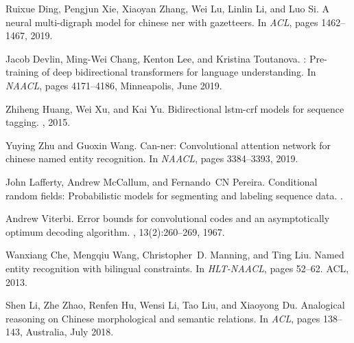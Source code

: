 \documentclass[conference]{IEEEtran}
\begin{document}
\begin{thebibliography}{00}
    Ruixue Ding, Pengjun Xie, Xiaoyan Zhang, Wei Lu, Linlin Li, and Luo Si.
    \newblock A neural multi-digraph model for chinese ner with gazetteers.
    \newblock In {\em ACL}, pages 1462--1467, 2019.
    
    Jacob Devlin, Ming-Wei Chang, Kenton Lee, and Kristina Toutanova.
    : Pre-training of deep bidirectional transformers for language
      understanding.
    \newblock In {\em NAACL}, pages 4171--4186, Minneapolis, June 2019.
    
    Zhiheng Huang, Wei Xu, and Kai Yu.
    \newblock Bidirectional lstm-crf models for sequence tagging.
    , 2015.
    
    Yuying Zhu and Guoxin Wang.
    \newblock Can-ner: Convolutional attention network for chinese named entity
      recognition.
    \newblock In {\em NAACL}, pages 3384--3393, 2019.
    
    John Lafferty, Andrew McCallum, and Fernando~CN Pereira.
    \newblock Conditional random fields: Probabilistic models for segmenting and
      labeling sequence data.
    .
    
    Andrew Viterbi.
    \newblock Error bounds for convolutional codes and an asymptotically optimum
      decoding algorithm.
    , 13(2):260--269, 1967.
    
    Wanxiang Che, Mengqiu Wang, Christopher~D. Manning, and Ting Liu.
    \newblock Named entity recognition with bilingual constraints.
    \newblock In {\em {HLT-NAACL}}, pages 52--62. ACL, 2013.
    
    Shen Li, Zhe Zhao, Renfen Hu, Wensi Li, Tao Liu, and Xiaoyong Du.
    \newblock Analogical reasoning on {C}hinese morphological and semantic
      relations.
    \newblock In {\em ACL}, pages 138--143, Australia, July 2018.
    
    \end{thebibliography}
    
\end{document}
